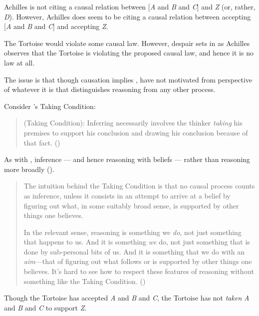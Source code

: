 \begin{note}
  Achilles is not citing a causal relation between [\emph{A} and \emph{B} and \emph{C}] and \emph{Z} (or, rather, \emph{D}).
  However, Achilles does seem to be citing a causal relation between accepting [\emph{A} and \emph{B} and \emph{C}] and accepting \emph{Z}.

  The Tortoise would violate some causal law.
  However, despair sets in as Achilles observes that the Tortoise is violating the proposed causal law, and hence it is no law at all.

  The issue is that though causation implies \ESU{}, have not motivated \ESU{} from perspective of whatever it is that distinguishes reasoning from any other process.
\end{note}

\begin{note}
  Consider \citeauthor{Boghossian:2014aa}'s Taking Condition:
  \begin{quote}
    (Taking Condition): Inferring necessarily involves the thinker \emph{taking} his premises to support his conclusion and drawing his conclusion because of that fact.\nolinebreak
    \mbox{}\hfill\mbox{(\Citeyear[5]{Boghossian:2014aa})}
  \end{quote}
  As with \citeauthor{Armstrong:1968vh}, inference --- and hence reasoning with beliefs --- rather than reasoning more broadly (\Citeyear[cf][2]{Boghossian:2014aa}).

  \begin{quote}
    The intuition behind the Taking Condition is that no causal process counts as inference, unless it consists in an attempt to arrive at a belief by figuring out what, in some suitably broad sense, is supported by other things one believes.

    In the relevant sense, reasoning is something we \emph{do}, not just something that happens to us.
    And it is something \emph{we} do, not just something that is done by sub-personal bits of us.
    And it is something that we do with an \emph{aim}---that of figuring out what follows or is supported by other things one believes.
    It’s hard to see how to respect these features of reasoning without something like the Taking Condition.\nolinebreak
    \mbox{}\hfill\mbox{(\Citeyear[5]{Boghossian:2014aa})}
  \end{quote}

  Though the Tortoise has accepted \emph{A} and \emph{B} and \emph{C}, the Tortoise has not \emph{taken} \emph{A} and \emph{B} and \emph{C} to support \emph{Z}.


\end{note}
